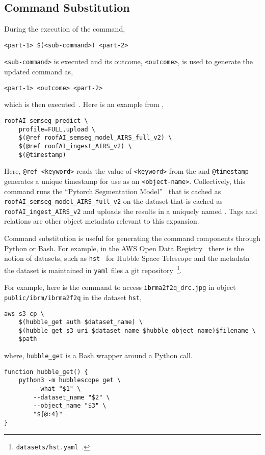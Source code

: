\subsection{Command Substitution}\label{command_substitution}

During the execution of the command,
%
\begin{verbatim}
<part-1> $(<sub-command>) <part-2>
\end{verbatim}
%
\texttt{<sub-command>} is executed and its outcome, \texttt{<outcome>}, is used to generate the updated command as,
%
\begin{verbatim}
<part-1> <outcome> <part-2>
\end{verbatim}
%
which is then executed~\cite{command_substitution}. Here is an example from ,
%
\begin{verbatim}
roofAI semseg predict \
    profile=FULL,upload \
    $(@ref roofAI_semseg_model_AIRS_full_v2) \
    $(@ref roofAI_ingest_AIRS_v2) \
    $(@timestamp)
\end{verbatim}
%
Here, \texttt{@ref <keyword>} reads the value of \texttt{<keyword>} from the  and \texttt{@timestamp} generates a unique timestamp for use as an \texttt{<object-name>}. Collectively, this command runs the \enquote{Pytorch Segmentation Model}~\cite{smp} that is cached as \texttt{roofAI\_semseg\_model\_AIRS\_full\_v2} on the dataset that is cached as \texttt{roofAI\_ingest\_AIRS\_v2} and uploads the results in a uniquely named . Tags and relations are other object metadata relevant to this expansion.

Command substitution is useful for generating the command components through Python or Bash. For example, in the AWS Open Data Registry~\cite{aws_open_data} there is the notion of datasets, such as \texttt{hst}~\cite{hst} for Hubble Space Telescope and the metadata the dataset is maintained in \texttt{yaml} files a git repository~\footnote{\texttt{datasets/hst.yaml}~\cite{aws_open_data}.}. 

For example, here is the command to access \texttt{ibrma2f2q\_drc.jpg} in object \texttt{public/ibrm/ibrma2f2q} in the dataset \texttt{hst},
%
\begin{verbatim}
aws s3 cp \
    $(hubble_get auth $dataset_name) \
    $(hubble_get s3_uri $dataset_name $hubble_object_name)$filename \
    $path
\end{verbatim}
%
where, \texttt{hubble\_get} is a Bash wrapper around a Python call.
%
\begin{verbatim}
function hubble_get() {
    python3 -m hubblescope get \
        --what "$1" \
        --dataset_name "$2" \
        --object_name "$3" \
        "${@:4}"
}
\end{verbatim}




